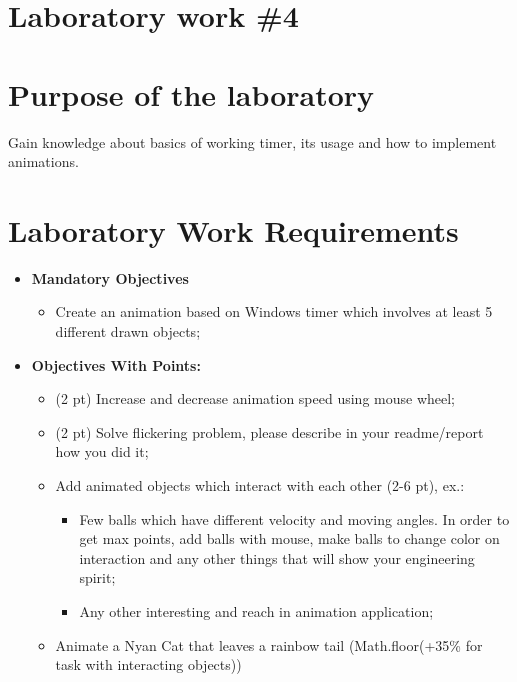 \section*{Laboratory work \#4}

\section{Purpose of the laboratory}
Gain knowledge about basics of working timer, its usage and how to implement animations.

\section{Laboratory Work Requirements}
\begin{itemize}
	\item \textbf{Mandatory Objectives}
	      \begin{itemize}
		      \item Create an animation based on Windows timer which involves at least 5 different drawn objects;
	      \end{itemize}
	\item \textbf{Objectives With Points:}
	      \begin{itemize}
		      \item (2 pt) Increase and decrease animation speed using mouse wheel;
		      \item (2 pt) Solve flickering problem, please describe in your readme/report how you did it;
		      \item Add animated objects which interact with each other (2-6 pt), ex.:
		      \begin{itemize}
		      	  \item Few balls which have different velocity and moving angles. In order to get max points, add balls with mouse, make balls to change color on interaction and any other things that will show your engineering spirit;
		      	  \item Any other interesting and reach in animation application;
		      \end{itemize}
	          \item Animate a Nyan Cat that leaves a rainbow tail (Math.floor(+35\% for task with interacting objects))
	      \end{itemize}
\end{itemize}

\clearpage